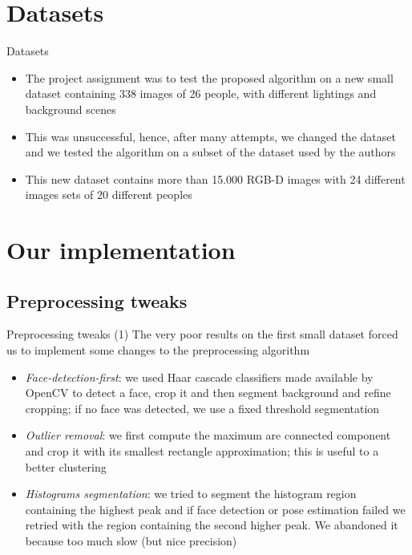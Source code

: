 \documentclass[unknownkeysallowed]{beamer}
\begin{document}
\section{Datasets}
\begin{frame}{Datasets}
	\begin{itemize}
		\item The project assignment was to test the proposed algorithm
			on a new small dataset containing 338 images of 26
			people, with different lightings and background scenes
		\item This was unsuccessful, hence, after many attempts, we
			changed the dataset and we tested the algorithm on a
			subset of the dataset used by the authors
		\item This new dataset contains more than 15.000 RGB-D images
			with 24 different images sets of 20 different peoples
	\end{itemize}
\end{frame}

\section{Our implementation}
\subsection{Preprocessing tweaks}
\begin{frame}{Preprocessing tweaks (1)}
	The very poor results on the first small dataset
	forced us to implement some changes to the
	preprocessing algorithm
	\begin{itemize}
		\item \textit{Face-detection-first}: we used Haar cascade
			classifiers made available by OpenCV to detect a face,
			crop it and then segment background and refine
			cropping; if no face was detected, we use a fixed
			threshold segmentation
		\item \textit{Outlier removal}: we first compute the maximum
			are connected component and crop it with its smallest
			rectangle approximation; this is useful to a better
			clustering
		\item \textit{Histograms segmentation}: we tried to segment the
			histogram region containing the highest peak and if face
			detection or pose estimation failed we retried
			with the region containing the second higher peak. We
			abandoned it because too much slow (but nice
			precision)
	\end{itemize}
\end{frame}
\end{document}
